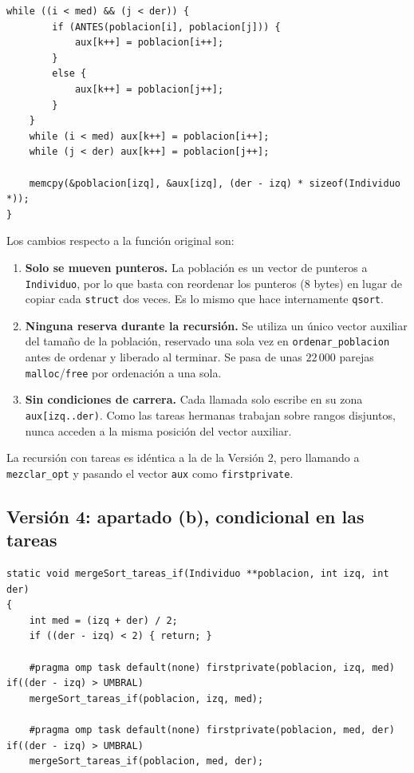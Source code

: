 \documentclass[12pt]{article}
\begin{document}
\begin{enumerate}
\begin{lstlisting}[style=EstiloC]
    while ((i < med) && (j < der)) {
        if (ANTES(poblacion[i], poblacion[j])) {
            aux[k++] = poblacion[i++];
        }
        else {
            aux[k++] = poblacion[j++];
        }
    }
    while (i < med) aux[k++] = poblacion[i++];
    while (j < der) aux[k++] = poblacion[j++];
 
    memcpy(&poblacion[izq], &aux[izq], (der - izq) * sizeof(Individuo *));
}
\end{lstlisting}
 
Los cambios respecto a la función original son:
 
\begin{enumerate}
    \item \textbf{Solo se mueven punteros.} La población es un vector de punteros a \texttt{Individuo}, por lo que basta con reordenar los punteros (8 bytes) en lugar de copiar cada \texttt{struct} dos veces. Es lo mismo que hace internamente \texttt{qsort}.
    \item \textbf{Ninguna reserva durante la recursión.} Se utiliza un único vector auxiliar del tamaño de la población, reservado una sola vez en \texttt{ordenar\_poblacion} antes de ordenar y liberado al terminar. Se pasa de unas $22\,000$ parejas \texttt{malloc}/\texttt{free} por ordenación a una sola.
    \item \textbf{Sin condiciones de carrera.} Cada llamada solo escribe en su zona \texttt{aux[izq..der)}. Como las tareas hermanas trabajan sobre rangos disjuntos, nunca acceden a la misma posición del vector auxiliar.
\end{enumerate}
 
La recursión con tareas es idéntica a la de la Versión 2, pero llamando a \texttt{mezclar\_opt} y pasando el vector \texttt{aux} como \texttt{firstprivate}.
 
\subsection*{Versión 4: apartado (b), condicional en las tareas}
 
\begin{lstlisting}[style=EstiloC]
static void mergeSort_tareas_if(Individuo **poblacion, int izq, int der)
{
    int med = (izq + der) / 2;
    if ((der - izq) < 2) { return; }
 
    #pragma omp task default(none) firstprivate(poblacion, izq, med) if((der - izq) > UMBRAL)
    mergeSort_tareas_if(poblacion, izq, med);
 
    #pragma omp task default(none) firstprivate(poblacion, med, der) if((der - izq) > UMBRAL)
    mergeSort_tareas_if(poblacion, med, der);
 

\end{lstlisting}
\end{enumerate}
\end{document}
